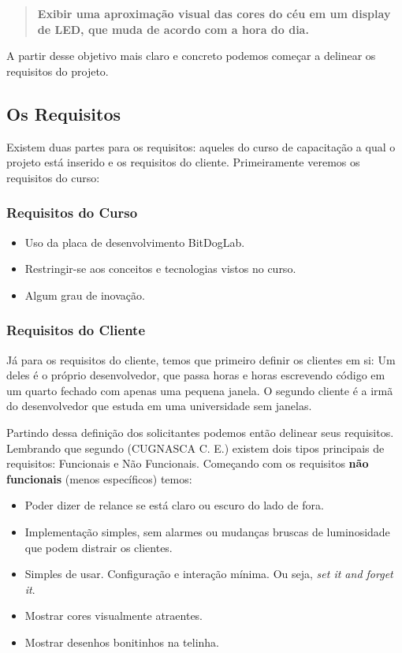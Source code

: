 \documentclass[12pt]{article}
\begin{document}
\begin{quote}
    \textbf{Exibir uma aproximação visual das cores do céu em um display de LED, que muda de acordo com a hora do dia.}
\end{quote}

A partir desse objetivo mais claro e concreto podemos começar a delinear os requisitos do projeto.

\subsection{Os Requisitos}
\label{requisitos}
Existem duas partes para os requisitos: aqueles do curso de capacitação a qual o projeto está inserido e os requisitos do cliente. Primeiramente veremos os requisitos do curso: 

\subsubsection{Requisitos do Curso}
\label{requisitoscurso}
\begin{itemize}
    \item Uso da placa de desenvolvimento BitDogLab.
    \item Restringir-se aos conceitos e tecnologias vistos no curso.
    \item Algum grau de inovação.
\end{itemize}

\subsubsection{Requisitos do Cliente}
Já para os requisitos do cliente, temos que primeiro definir os clientes em si: Um deles é o próprio desenvolvedor, que passa horas e horas escrevendo código em um quarto fechado com apenas uma pequena janela. O segundo cliente é a irmã do desenvolvedor que estuda em uma universidade sem janelas.

Partindo dessa definição dos solicitantes podemos então delinear seus requisitos. Lembrando que segundo (CUGNASCA C. E.)\cite{cugnasca} existem dois tipos principais de requisitos: Funcionais e Não Funcionais.
Começando com os requisitos \textbf{não funcionais} (menos específicos) temos:

\begin{itemize}
    \item Poder dizer de relance se está claro ou escuro do lado de fora.
    \item Implementação simples, sem alarmes ou mudanças bruscas de luminosidade que podem distrair os clientes.
    \item Simples de usar. Configuração e interação mínima. Ou seja, \textit{set it and forget it}.
    \item Mostrar cores visualmente atraentes.
    \item Mostrar desenhos bonitinhos na telinha.
\end{itemize}
\end{document}
